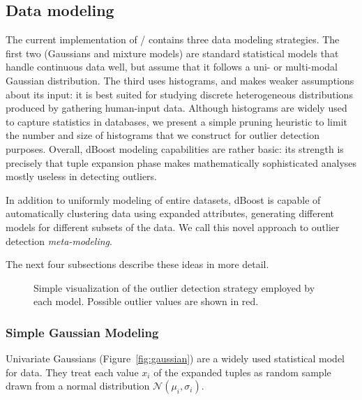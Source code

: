 \subsection{Data modeling}
\label{sec:model-creation}

The current implementation of \dBoost/ contains three data modeling strategies. The first two (Gaussians and mixture models) are standard statistical models that handle continuous data well, but assume that it follows a uni- or multi-modal Gaussian distribution.
The third uses histograms, and makes weaker assumptions about its input: it is best suited for studying discrete heterogeneous distributions produced by gathering human-input data. Although histograms are widely used to capture statistics in databases, we present a simple pruning heuristic to limit the number and size of histograms that we construct for outlier detection purposes. Overall, dBoost modeling capabilities are rather basic: its strength is precisely that tuple expansion phase makes mathematically sophisticated analyses mostly useless in detecting outliers. 

In addition to uniformly modeling of entire datasets, dBoost is capable of automatically clustering data using expanded attributes, generating different models for different subsets of the data. We call this novel approach to outlier detection \emph{meta-modeling}.

The next four subsections describe these ideas in more detail.

\begin{figure}
  \centering
  \newcommand{\cramped}[3]{\subfloat[#2]{\texttt{[image: \#1]}\label{fig:#3}}}
  \cramped{../../graphics/gaussians-preview.pdf}{Gaussian}{gaussian}\hspace*{.01\linewidth}
  \cramped{../../graphics/mixtures-preview.png}{Mixture}{mixture}\hspace*{.01\linewidth}
  \cramped{../../graphics/histograms-preview.pdf}{Histogram}{histogram}
  \caption{Simple visualization of the outlier detection strategy employed by each model. Possible outlier values are shown in red.}
  \label{fig:models}
\end{figure}

\subsubsection{Simple Gaussian Modeling}
\label{sec:gaus_model}
Univariate Gaussians (Figure~\ref{fig:gaussian}) are a widely used statistical model for data. They treat each value $x_i$ of the expanded tuples as random sample drawn from a normal distribution $\mathcal N(\mu_i, \sigma_i)$.

